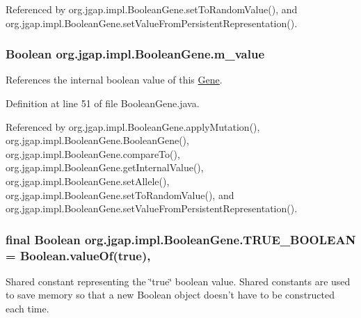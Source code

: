 Referenced by org.\-jgap.\-impl.\-Boolean\-Gene.\-set\-To\-Random\-Value(), and org.\-jgap.\-impl.\-Boolean\-Gene.\-set\-Value\-From\-Persistent\-Representation().

\hypertarget{classorg_1_1jgap_1_1impl_1_1_boolean_gene_acd3b6512c17c7acf81b8d96a913d83cc}{
\subsubsection[{m\-\_\-value}]{\setlength{\rightskip}{0pt plus 5cm}Boolean org.\-jgap.\-impl.\-Boolean\-Gene.\-m\-\_\-value\hspace{0.3cm}{\ttfamily [private]}}}\label{classorg_1_1jgap_1_1impl_1_1_boolean_gene_acd3b6512c17c7acf81b8d96a913d83cc}
References the internal boolean value of this \hyperlink{interfaceorg_1_1jgap_1_1_gene}{Gene}. 

Definition at line 51 of file Boolean\-Gene.\-java.



Referenced by org.\-jgap.\-impl.\-Boolean\-Gene.\-apply\-Mutation(), org.\-jgap.\-impl.\-Boolean\-Gene.\-Boolean\-Gene(), org.\-jgap.\-impl.\-Boolean\-Gene.\-compare\-To(), org.\-jgap.\-impl.\-Boolean\-Gene.\-get\-Internal\-Value(), org.\-jgap.\-impl.\-Boolean\-Gene.\-set\-Allele(), org.\-jgap.\-impl.\-Boolean\-Gene.\-set\-To\-Random\-Value(), and org.\-jgap.\-impl.\-Boolean\-Gene.\-set\-Value\-From\-Persistent\-Representation().

\hypertarget{classorg_1_1jgap_1_1impl_1_1_boolean_gene_a1ac51ccfad17bf032f212248ab27c4d8}{
\subsubsection[{T\-R\-U\-E\-\_\-\-B\-O\-O\-L\-E\-A\-N}]{\setlength{\rightskip}{0pt plus 5cm}final Boolean org.\-jgap.\-impl.\-Boolean\-Gene.\-T\-R\-U\-E\-\_\-\-B\-O\-O\-L\-E\-A\-N = Boolean.\-value\-Of(true)\hspace{0.3cm}{\ttfamily [static]}, {\ttfamily [protected]}}}\label{classorg_1_1jgap_1_1impl_1_1_boolean_gene_a1ac51ccfad17bf032f212248ab27c4d8}
Shared constant representing the \char`\"{}true\char`\"{} boolean value. Shared constants are used to save memory so that a new Boolean object doesn't have to be constructed each time. 

